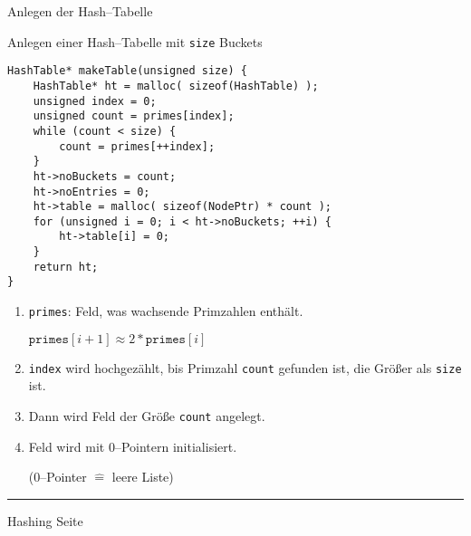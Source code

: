 \begin{slide}{}
\normalsize

\begin{center}
Anlegen der Hash--Tabelle
\end{center}
\vspace*{0.5cm}

\footnotesize
Anlegen einer Hash--Tabelle mit \texttt{size} Buckets
\begin{verbatim}
HashTable* makeTable(unsigned size) {
    HashTable* ht = malloc( sizeof(HashTable) );
    unsigned index = 0;
    unsigned count = primes[index];
    while (count < size) {
        count = primes[++index];
    }
    ht->noBuckets = count;
    ht->noEntries = 0;
    ht->table = malloc( sizeof(NodePtr) * count );
    for (unsigned i = 0; i < ht->noBuckets; ++i) {
        ht->table[i] = 0;
    }
    return ht;
}
\end{verbatim}
\begin{enumerate}
\item \texttt{primes}: Feld, was wachsende Primzahlen enth\"alt.

      $\mathtt{primes}[i+1] \approx 2 * \mathtt{primes}[i]$
\item \texttt{index} wird hochgez\"ahlt, bis Primzahl \texttt{count} gefunden ist,
      die Gr\"o{\ss}er als \texttt{size} ist.
\item Dann wird Feld der Gr\"o{\ss}e \texttt{count} angelegt.
\item Feld wird mit 0--Pointern initialisiert.

      (0--Pointer $\widehat{=}$ leere Liste)
\end{enumerate}


\vspace*{\fill}
\tiny \addtocounter{mypage}{1}
\rule{17cm}{1mm}
Hashing  \hspace*{\fill} Seite 
\end{slide}


